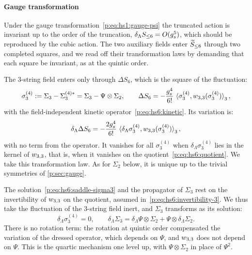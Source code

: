 

\paragraph{Gauge transformation}
\label{p:sec:hs:sextic:gauge}

Under the gauge transformation~\eqref{p:eq:hs1:gauge-psi} the truncated action is invariant up to the order of the truncation, $\delta_\Lambda S_{\le 6} = O(\gs^5)$, which should be reproduced by the cubic action.
The two auxiliary fields enter $\caction[\le 6]$ through two completed squares, and we read off their transformation laws by demanding that each square be invariant, as at the quintic order.

The $3$-string field enters only through $\Delta S_6$, which is the square of the fluctuation:
\begin{equation}
  \label{p:eq:hs6:deviation-3}
  \sigma_3^{(4)}
    := \Sigma_3 - \Sigma_3^{(4)*}
    = \Sigma_3 - \Psi \otimes \Sigma_2,
  \qquad
  \Delta S_6
    = - \frac{\gs^4}{6!} \, \pair[3]{\sigma_3^{(4)}}{\wprod{3}{3}(\sigma_3^{(4)})},
\end{equation}
with the field-independent kinetic operator~\eqref{p:eq:hs6:kinetic}.
Its variation is:
\begin{equation}
  \label{p:eq:hs6:square-variation-3}
  \delta_\Lambda \Delta S_6
    = - \frac{2 \gs^4}{6!} \, \pair[3]{\delta_\Lambda \sigma_3^{(4)}}{\wprod{3}{3}(\sigma_3^{(4)})},
\end{equation}
with no term from the operator.
It vanishes for all $\sigma_3^{(4)}$ when $\delta_\Lambda \sigma_3^{(4)}$ lies in the kernel of $\wprod{3}{3}$, that is, when it vanishes on the quotient~\eqref{p:eq:hs6:quotient}.
We take this transformation law.
As for $\Sigma_2$ below, it is unique up to the trivial symmetries of \cref{p:sec:gauge}.

The solution~\eqref{p:eq:hs6:saddle-sigma3} and the propagator of $\Sigma_3$ rest on the invertibility of $\wprod{3}{3}$ on the quotient, assumed in~\eqref{p:eq:hs6:invertibility-3}.
We thus take the fluctuation of the $3$-string field inert, and $\Sigma_3$ transforms as its solution:
\begin{equation}
  \label{p:eq:hs6:gauge-sigma3}
  \delta_\Lambda \sigma_3^{(4)}
    = 0,
  \qquad
  \delta_\Lambda \Sigma_3
    = \delta_\Lambda \Psi \otimes \Sigma_2 + \Psi \otimes \delta_\Lambda \Sigma_2.
\end{equation}
There is no rotation term: the rotation at quintic order compensated the variation of the dressed operator, which depends on $\Psi$, and $\wprod{3}{3}$ does not depend on $\Psi$.
This is the quartic mechanism one level up, with $\Psi \otimes \Sigma_2$ in place of $\Psi^2$.


